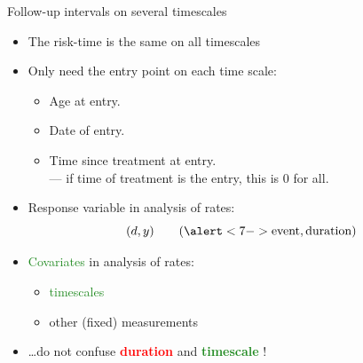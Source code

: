 \begin{frame}[fragile]{Follow-up intervals on several timescales}
  \begin{itemize}[<+->]
  \item The risk-time is the same on all timescales
  \item Only need the entry point on each time scale:

  \begin{itemize}
    \item Age at entry.
    \item Date of entry.
    \item Time since treatment at entry.\\
          --- if time of treatment is the entry, this is $0$ for all.
  \end{itemize}

  \item \alert<7->{Response variable} in analysis of rates:\\[-1em]
\[ (d,y) \qquad (\alert<7->{\text{event}, \text{duration}}) \]

  \item \textcolor{forestgreen}{Covariates} in analysis of rates:

  \begin{itemize}[<+->]
    \item \textcolor{forestgreen}{timescales}
    \item other (fixed) measurements
  \end{itemize}
\item \ldots do not confuse  \textcolor{red}{\textbf{duration}} and
                     \textcolor{forestgreen}{\textbf{timescale}} !
  \end{itemize}
\end{frame}

